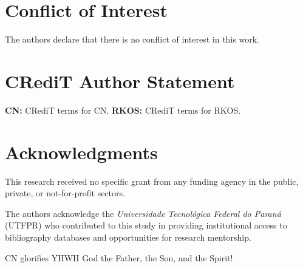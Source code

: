 
\section*{Conflict of Interest}

    The authors declare that there is no conflict of interest in this work.



\section*{CRediT Author Statement} %

    \textbf{CN:} CRediT terms for CN. \textbf{RKOS:} CRediT terms for RKOS.



\section*{Acknowledgments}

    This research received no specific grant from any funding agency in the public, private, or not-for-profit sectors.

    The authors acknowledge the \textit{Universidade Tecnológica Federal do Paraná} (UTFPR) who contributed  to  this  study  in
    providing institutional access to bibliography databases and opportunities for research mentorship.

    CN glorifies YHWH God the Father, the Son, and the Spirit!




